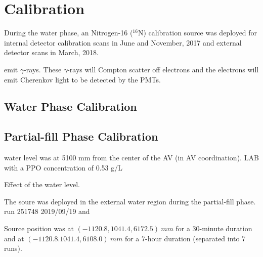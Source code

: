 \section{ Calibration}

During the water phase, an Nitrogen-16 ($^{16}$N) calibration source was deployed for internal detector calibration scans in June and November, 2017 and external detector scans in March, 2018. 






emit $\gamma$-rays. These $\gamma$-rays will Compton scatter off electrons and the electrons will emit Cherenkov light to be detected by the PMTs.














\subsection{Water Phase Calibration}

\subsection{Partial-fill Phase Calibration}

water level was at 5100 mm from the center of the AV (in AV coordination).
LAB with a PPO concentration of 0.53 g/L  




Effect of the water level.







The  soure was deployed in the external water region during the partial-fill phase.
run 251748 2019/09/19 and 


Source position was at $(-1120.8, 1041.4, 6172.5)~ mm$ for a 30-minute duration and at $(-1120.8. 1041.4, 6108.0)~mm$ for a 7-hour duration (separated into 7 runs).
















